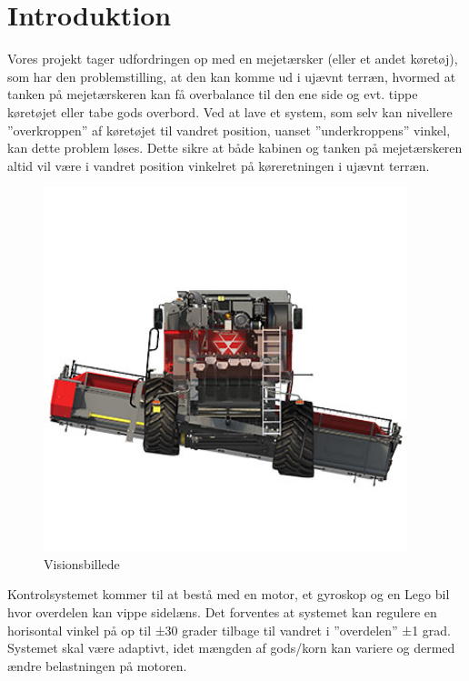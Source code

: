 \section{Introduktion}

Vores projekt tager udfordringen op med en mejetærsker (eller et andet køretøj), som har den problemstilling, at den kan komme ud i ujævnt terræn, hvormed at tanken på mejetærskeren kan få overbalance til den ene side og evt. tippe køretøjet eller tabe gods overbord. Ved at lave et system, som selv kan nivellere ”overkroppen” af køretøjet til vandret position, uanset ”underkroppens” vinkel, kan dette problem løses. Dette sikre at både kabinen og tanken på mejetærskeren altid vil være i vandret position vinkelret på køreretningen i ujævnt terræn.

\begin{figure}[H]
	\centering
	\includegraphics[width = 300pt]{figur/Visionbillede}
	\caption{Visionsbillede}
	\label{fig:konceptbillede}
\end{figure}

Kontrolsystemet kommer til at bestå med en motor, et gyroskop og en Lego bil hvor overdelen kan vippe sidelæns. Det forventes at systemet kan regulere en horisontal vinkel på op til ±30 grader tilbage til vandret i ”overdelen” ±1 grad. Systemet skal være adaptivt, idet mængden af gods/korn kan variere og dermed ændre belastningen på motoren.   \\ 

\newpage
